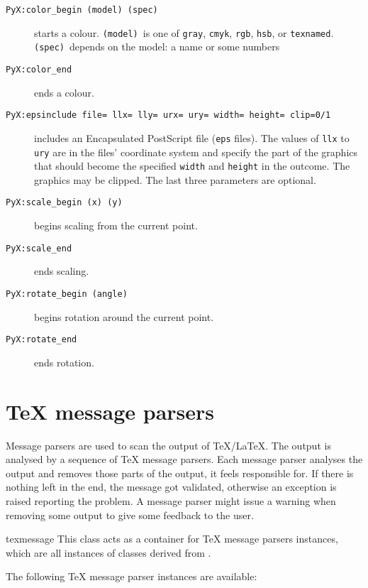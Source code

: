 \begin{description}
\item[\texttt{PyX:color\_begin (model) (spec)}]
  starts a colour. \texttt{(model)}~is one of
  \texttt{gray}, \texttt{cmyk}, \texttt{rgb}, \texttt{hsb}, or
  \texttt{texnamed}. \texttt{(spec)}~depends on the model: a name or
  some numbers
\item[\texttt{PyX:color\_end}]
  ends a colour.
\item[\texttt{PyX:epsinclude file= llx= lly= urx= ury= width= height= clip=0/1}]
  includes an Encapsulated PostScript file (\texttt{eps}
  files). The values of \texttt{llx} to \texttt{ury} are in the files'
  coordinate system and specify the part of the graphics that should
  become the specified \texttt{width} and \texttt{height} in the
  outcome. The graphics may be clipped. The last three parameters are
  optional.
\item[\texttt{PyX:scale\_begin (x) (y)}]
  begins scaling from the current point.
\item[\texttt{PyX:scale\_end}]
  ends scaling.
\item[\texttt{PyX:rotate\_begin (angle)}]
  begins rotation around the current point.
\item[\texttt{PyX:rotate\_end}]
  ends rotation.
\end{description}

\section[TeX message parsers]%
{\TeX{} message parsers}

Message parsers are used to scan the output of \TeX/\LaTeX. The output
is analysed by a sequence of \TeX{} message parsers. Each message
parser analyses the output and removes those parts of the output, it
feels responsible for. If there is nothing left in the end, the
message got validated, otherwise an exception is raised reporting the
problem. A message parser might issue a warning when removing some
output to give some feedback to the user.

\begin{classdesc}{texmessage}{}
  This class acts as a container for \TeX{} message parsers instances,
  which are all instances of classes derived from .
\end{classdesc}

The following \TeX{} message parser instances are available:

